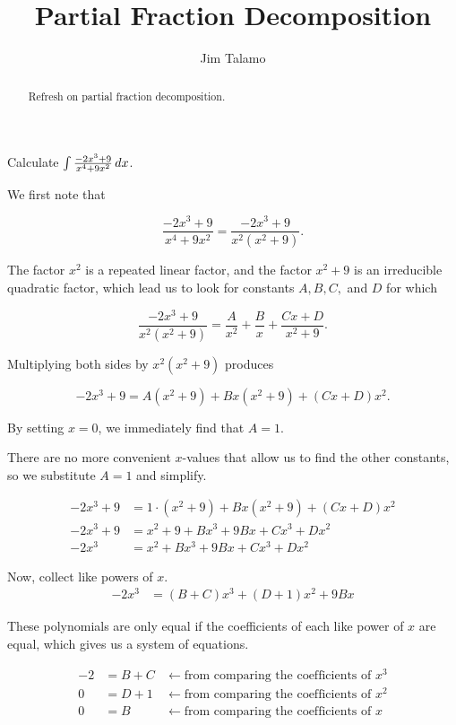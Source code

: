 \documentclass{ximera}
\title[Refresh:]{Partial Fraction Decomposition}
\author{Jim Talamo}
\begin{document}
\begin{abstract}
 Refresh on partial fraction decomposition.
\end{abstract}

\begin{example}
Calculate $\int \frac{-2x^3+9}{x^4+9x^2} \,d x$.  

\begin{explanation}
We first note that 

\[
\frac{-2x^3+9}{x^4+9x^2} = \frac{-2x^3+9}{x^2(x^2+9)}.
\] 

The factor $x^2$ is a repeated linear factor, and the factor $x^2+9$ is an irreducible quadratic factor, which lead us to look for constants $A, B, C,$ and $D$ for which 

\[
\frac{-2x^3+9}{x^2(x^2+9)} = \frac{A}{x^2}+\frac{B}{x}+\frac{Cx+D}{x^2+9}.
\]

Multiplying both sides by $x^2(x^2+9)$ produces

\[
-2x^3+9 = A(x^2+9)+Bx(x^2+9)+(Cx+D)x^2.
\]

By setting $x=0$, we immediately find that $A=1$.

There are no more convenient $x$-values that allow us to find the other constants, so we substitute $A=1$ and simplify.

\begin{align*}
-2x^3+9 &= 1\cdot(x^2+9)+Bx(x^2+9)+(Cx+D)x^2 \\
-2x^3+9 &= x^2+9+Bx^3+9Bx+Cx^3+Dx^2 \\
-2x^3 &= x^2+Bx^3+9Bx+Cx^3+Dx^2
\end{align*}

Now, collect like powers of $x$.
\begin{align*}
-2x^3 &= (B+C)x^3 +(D+1)x^2 +9Bx
\end{align*}

These polynomials are only equal if the coefficients of each like power of $x$ are equal, which gives us a system of equations.

\begin{align*}
-2 & = B+C & \longleftarrow \textrm{from comparing the coefficients of } x^3 \\
0 & = D+1 & \longleftarrow  \textrm{from comparing the coefficients of } x^2 \\
0 & = B & \longleftarrow  \textrm{from comparing the coefficients of } x 
\end{align*}


\end{explanation}
\end{example}
\end{document}

